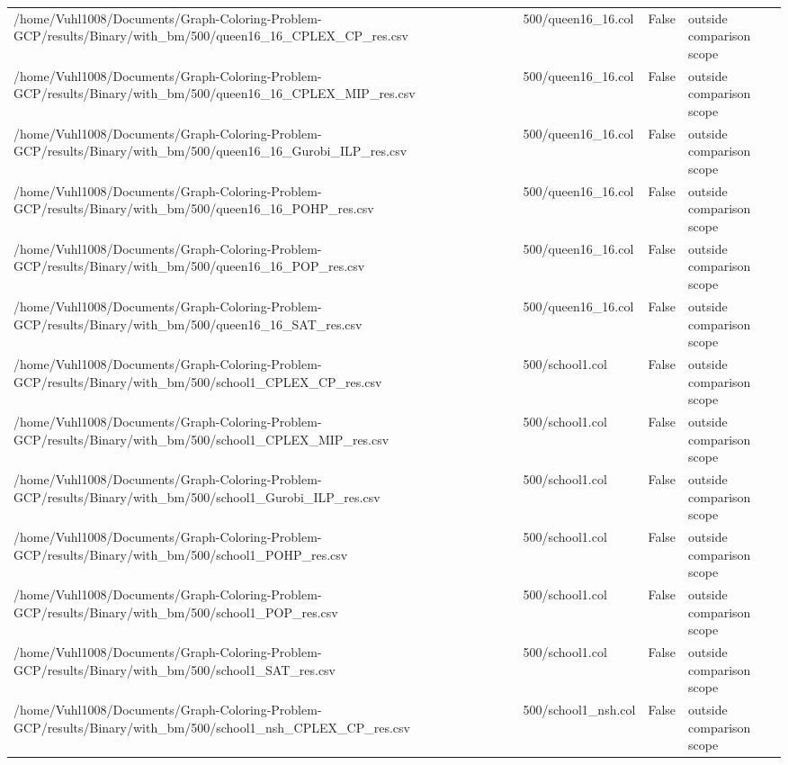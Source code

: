 \begin{table}[htbp]
\begin{tabular}{llll}
/home/Vuhl1008/Documents/Graph-Coloring-Problem-GCP/results/Binary/with\_bm/500/queen16\_16\_CPLEX\_CP\_res.csv & 500/queen16\_16.col & False & outside comparison scope \\
/home/Vuhl1008/Documents/Graph-Coloring-Problem-GCP/results/Binary/with\_bm/500/queen16\_16\_CPLEX\_MIP\_res.csv & 500/queen16\_16.col & False & outside comparison scope \\
/home/Vuhl1008/Documents/Graph-Coloring-Problem-GCP/results/Binary/with\_bm/500/queen16\_16\_Gurobi\_ILP\_res.csv & 500/queen16\_16.col & False & outside comparison scope \\
/home/Vuhl1008/Documents/Graph-Coloring-Problem-GCP/results/Binary/with\_bm/500/queen16\_16\_POHP\_res.csv & 500/queen16\_16.col & False & outside comparison scope \\
/home/Vuhl1008/Documents/Graph-Coloring-Problem-GCP/results/Binary/with\_bm/500/queen16\_16\_POP\_res.csv & 500/queen16\_16.col & False & outside comparison scope \\
/home/Vuhl1008/Documents/Graph-Coloring-Problem-GCP/results/Binary/with\_bm/500/queen16\_16\_SAT\_res.csv & 500/queen16\_16.col & False & outside comparison scope \\
/home/Vuhl1008/Documents/Graph-Coloring-Problem-GCP/results/Binary/with\_bm/500/school1\_CPLEX\_CP\_res.csv & 500/school1.col & False & outside comparison scope \\
/home/Vuhl1008/Documents/Graph-Coloring-Problem-GCP/results/Binary/with\_bm/500/school1\_CPLEX\_MIP\_res.csv & 500/school1.col & False & outside comparison scope \\
/home/Vuhl1008/Documents/Graph-Coloring-Problem-GCP/results/Binary/with\_bm/500/school1\_Gurobi\_ILP\_res.csv & 500/school1.col & False & outside comparison scope \\
/home/Vuhl1008/Documents/Graph-Coloring-Problem-GCP/results/Binary/with\_bm/500/school1\_POHP\_res.csv & 500/school1.col & False & outside comparison scope \\
/home/Vuhl1008/Documents/Graph-Coloring-Problem-GCP/results/Binary/with\_bm/500/school1\_POP\_res.csv & 500/school1.col & False & outside comparison scope \\
/home/Vuhl1008/Documents/Graph-Coloring-Problem-GCP/results/Binary/with\_bm/500/school1\_SAT\_res.csv & 500/school1.col & False & outside comparison scope \\
/home/Vuhl1008/Documents/Graph-Coloring-Problem-GCP/results/Binary/with\_bm/500/school1\_nsh\_CPLEX\_CP\_res.csv & 500/school1\_nsh.col & False & outside comparison scope \\

\end{tabular}
\end{table}
